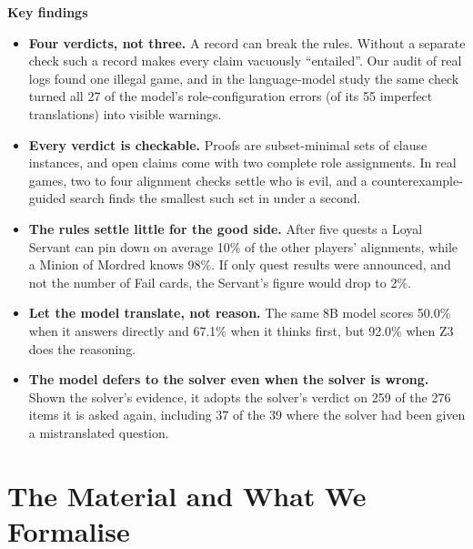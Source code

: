 \documentclass[runningheads]{llncs}
\begin{document}
\begin{takeaway}
\textbf{Key findings}
\begin{itemize}[leftmargin=1.2em]
\item \textbf{Four verdicts, not three.} A record can break the rules. Without a separate check such a record makes
every claim vacuously ``entailed''. Our audit of real logs found one illegal game, and in the language-model
study the same check turned all 27 of the model's role-configuration errors (of its 55 imperfect translations) into
visible warnings.
\item \textbf{Every verdict is checkable.} Proofs are subset-minimal sets of clause instances, and open claims come
with two complete role assignments. In real games, two to four alignment checks settle who is evil, and a
counterexample-guided search finds the smallest such set in under a second.
\item \textbf{The rules settle little for the good side.} After five quests a Loyal Servant can pin down on average
10\% of the other players' alignments, while a Minion of Mordred knows 98\%. If only quest results were announced,
and not the number of Fail cards, the Servant's figure would drop to 2\%.
\item \textbf{Let the model translate, not reason.} The same 8B model scores 50.0\% when it answers directly and
67.1\% when it thinks first, but 92.0\% when Z3 does the reasoning.
\item \textbf{The model defers to the solver even when the solver is wrong.} Shown the solver's evidence, it adopts
the solver's verdict on 259 of the 276 items it is asked again, including 37 of the 39 where the solver had been
given a mistranslated question.
\end{itemize}
\end{takeaway}

\section{The Material and What We Formalise}\label{sec:material}
\end{document}
